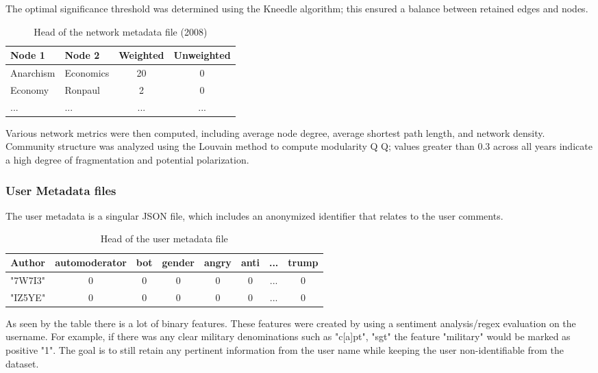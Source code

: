 \documentclass{article}
\theoremstyle{definition}
\begin{document}
The optimal significance threshold was determined using the Kneedle algorithm\cite{kneedle}; this ensured a balance between retained edges and nodes. 

\begin{table}[h]
\centering
\begin{tabular}[]{llcc}
\hline
Node 1 & Node 2 & Weighted &Unweighted\\
\hline
Anarchism & Economics & 20       & 0          \\
Economy   & Ronpaul   & 2        & 0          \\
...       & ...       & ...      & ...          \\
\hline
\end{tabular}
\vspace{10pt}
\caption{Head of the network metadata file (2008)}
\end{table}%


Various network metrics were then computed, including average node degree, average shortest path length, and network density. Community structure was analyzed using the Louvain method to compute modularity 
Q
Q; values greater than 0.3 across all years indicate a high degree of fragmentation and potential polarization.


\subsubsection{User Metadata files}

The user metadata is a singular JSON file, which includes an anonymized identifier that relates to the user comments.

\begin{table}[h]
\centering
\begin{tabular}[]{cccccccc}
\hline
Author & automoderator & bot & gender & angry & anti & ... & trump\\
\hline
"7W7I3"   &   0   &   0   &   0   &   0   &   0   &   ... &   0   \\
"IZ5YE"   &   0   &   0   &   0   &   0   &   0   &   ... &   0   \\
\hline
\end{tabular}
\vspace{10pt}
\caption{Head of the user metadata file}
\end{table}%

As seen by the table there is a lot of binary features. These features were created by using a sentiment analysis/regex evaluation on the username. For example, if there was any clear military denominations such as "c[a]pt", "sgt" the feature "military" would be marked as positive "1". The goal is to still retain any pertinent information from the user name while keeping the user non-identifiable from the dataset.
\end{document}
